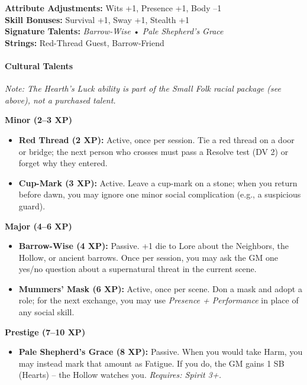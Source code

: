 \begin{tcolorbox}[colback=black!3!white,colframe=black!40!white,title=Aelaerem at a Glance,breakable]
\textbf{Attribute Adjustments:} Wits +1, Presence +1, Body --1 \\
\textbf{Skill Bonuses:} Survival +1, Sway +1, Stealth +1 \\
\textbf{Signature Talents:} \emph{Barrow-Wise} • \emph{Pale Shepherd's Grace} \\
\textbf{Strings:} Red-Thread Guest, Barrow-Friend
\end{tcolorbox}

\paragraph{Cultural Talents}
\textit{Note: The \emph{Hearth's Luck} ability is part of the Small Folk racial package (see above), not a purchased talent.}

\textbf{Minor (2--3 XP)}
\begin{itemize}
  \item \textbf{Red Thread (2 XP):} Active, once per session. Tie a red thread on a door or bridge; the next person who crosses must pass a Resolve test (DV 2) or forget why they entered.
  \item \textbf{Cup-Mark (3 XP):} Active. Leave a cup-mark on a stone; when you return before dawn, you may ignore one minor social complication (e.g., a suspicious guard).
\end{itemize}

\textbf{Major (4--6 XP)}
\begin{itemize}
  \item \textbf{Barrow-Wise (4 XP):} Passive. +1 die to Lore about the Neighbors, the Hollow, or ancient barrows. Once per session, you may ask the GM one yes/no question about a supernatural threat in the current scene.
  \item \textbf{Mummers' Mask (6 XP):} Active, once per scene. Don a mask and adopt a role; for the next exchange, you may use \emph{Presence + Performance} in place of any social skill.
\end{itemize}

\textbf{Prestige (7--10 XP)}
\begin{itemize}
  \item \textbf{Pale Shepherd's Grace (8 XP):} Passive. When you would take Harm, you may instead mark that amount as Fatigue. If you do, the GM gains 1 SB (Hearts) -- the Hollow watches you. \textit{Requires: Spirit 3+.}
\end{itemize}

